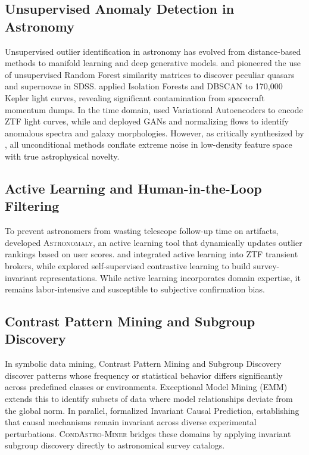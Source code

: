 \documentclass[10pt,a4paper]{article}
\begin{document}
\subsection{Unsupervised Anomaly Detection in Astronomy}
Unsupervised outlier identification in astronomy has evolved from distance-based methods to manifold learning and deep generative models. \citet{baron2017weirdest} and \citet{reis2018outlier} pioneered the use of unsupervised Random Forest similarity matrices to discover peculiar quasars and supernovae in SDSS. \citet{giles2019kepler} applied Isolation Forests and DBSCAN to 170,000 Kepler light curves, revealing significant contamination from spacecraft momentum dumps. In the time domain, \citet{villar2020vae} used Variational Autoencoders to encode ZTF light curves, while \citet{prochaska2019gan} and \citet{storeyfisher2024generative} deployed GANs and normalizing flows to identify anomalous spectra and galaxy morphologies. However, as critically synthesized by \citet{baron2019critical}, all unconditional methods conflate extreme noise in low-density feature space with true astrophysical novelty.

\subsection{Active Learning and Human-in-the-Loop Filtering}
To prevent astronomers from wasting telescope follow-up time on artifacts, \citet{lochner2021astronomaly} developed \textsc{Astronomaly}, an active learning tool that dynamically updates outlier rankings based on user scores. \citet{ishida2021active} and \citet{malanchev2021ztf} integrated active learning into ZTF transient brokers, while \citet{cubrilo2024contrastive} explored self-supervised contrastive learning to build survey-invariant representations. While active learning incorporates domain expertise, it remains labor-intensive and susceptible to subjective confirmation bias.

\subsection{Contrast Pattern Mining and Subgroup Discovery}
In symbolic data mining, Contrast Pattern Mining \citep{fournierviger2017contrast} and Subgroup Discovery \citep{duivesteijn2016emm} discover patterns whose frequency or statistical behavior differs significantly across predefined classes or environments. Exceptional Model Mining (EMM) \citep{duivesteijn2016emm} extends this to identify subsets of data where model relationships deviate from the global norm. In parallel, \citet{peters2016invariant} formalized Invariant Causal Prediction, establishing that causal mechanisms remain invariant across diverse experimental perturbations. \textsc{CondAstro-Miner} bridges these domains by applying invariant subgroup discovery directly to astronomical survey catalogs.
\end{document}
